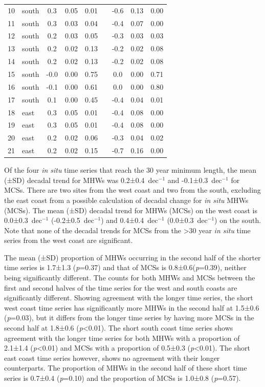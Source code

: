 \documentclass[a4paper,10pt,review]{elsarticle}
\begin{document}
\begin{table}[]
\begin{tiny}
\begin{tabular}{llccccccc}
  10 & south & 0.3 & 0.05 & 0.01 && -0.6 & 0.13 & 0.00 \\
  11 & south & 0.3 & 0.03 & 0.04 && -0.4 & 0.07 & 0.00 \\
  12 & south & 0.2 & 0.03 & 0.05 && -0.3 & 0.03 & 0.03 \\
  13 & south & 0.2 & 0.02 & 0.13 && -0.2 & 0.02 & 0.08 \\
  14 & south & 0.2 & 0.02 & 0.13 && -0.2 & 0.02 & 0.08 \\
  15 & south & -0.0 & 0.00 & 0.75 && 0.0 & 0.00 & 0.71 \\
  16 & south & -0.1 & 0.00 & 0.61 && 0.0 & 0.00 & 0.80 \\
  17 & south & 0.1 & 0.00 & 0.45 && -0.4 & 0.04 & 0.01 \\
  18 & east & 0.3 & 0.05 & 0.01 && -0.4 & 0.08 & 0.00 \\
  19 & east & 0.3 & 0.05 & 0.01 && -0.4 & 0.08 & 0.00 \\
  20 & east & 0.2 & 0.02 & 0.06 && -0.3 & 0.04 & 0.02 \\
  21 & east & 0.2 & 0.02 & 0.15 && -0.7 & 0.16 & 0.00 \\
\bottomrule
\end{tabular}
\end{tiny}
\end{table}

Of the four \emph{in situ} time series that reach the 30 year minimum length, the mean (±SD) decadal trend for MHWs was 0.2±0.4~dec$^{-1}$ and -0.1±0.3~dec$^{-1}$ for MCSs. There are two sites from the west coast and two from the south, excluding the east coast from a possible calculation of decadal change for \emph{in situ} MHWs (MCSs). The mean (±SD) decadal trend for MHWs (MCSs) on the west coast is 0.0±0.3~dec$^{-1}$ (-0.2±0.5~dec$^{-1}$) and 0.4±0.4~dec$^{-1}$ (0.0±0.3~dec$^{-1}$) on the south. Note that none of the decadal trends for MCSs from the >30 year \emph{in situ} time series from the west coast are significant.

The mean (±SD) proportion of MHWs occurring in the second half of the shorter time series is 1.7±1.3 (\emph{p}=0.37) and that of MCSs is 0.8±0.6(\emph{p}=0.39), neither being significantly different. The counts for both MHWs and MCSs between the first and second halves of the time series for the west and south coasts are significantly different. Showing agreement with the longer time series, the short west coast time series has significantly more MHWs in the second half at 1.5±0.6 (\emph{p}=0.03), but it differs from the longer time series by having more MCSs in the second half at 1.8±0.6 (\emph{p}<0.01). The short south coast time series shows agreement with the longer time series for both MHWs with a proportion of 2.1±1.4 (\emph{p}<0.01) and MCSs with a proportion of 0.5±0.3 (\emph{p}<0.01). The short east coast time series however, shows no agreement with their longer counterparts. The proportion of MHWs in the second half of these short time series is 0.7±0.4 (\emph{p}=0.10) and the proportion of MCSs is 1.0±0.8 (\emph{p}=0.57).
\end{document}
